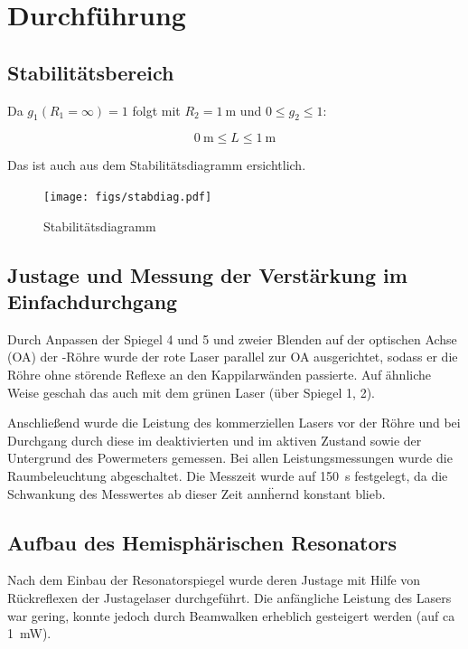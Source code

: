 \documentclass[slug=GL, room=HZDR\ Dresden/Rossendorf\,\ Geb.\ 620/123, supervisor=Tim\ Ziegler]{../../Lab_Report_LaTeX/lab_report}
\begin{document}
\section{Durchf\"uhrung}
\label{sec:durch}

\subsection{Stabilit\"atsbereich}
\label{sec:stabber}

Da \(g_1(R_1=\infty)=1\) folgt mit \(R_2=\SI{1}{\meter}\) und \(0\leq g_2\leq 1\):

\begin{equation}
  \label{eq:stabber}
  \SI{0}{\meter}\leq L \leq \SI{1}{\meter}
\end{equation}

Das ist auch aus dem Stabilit\"atsdiagramm ersichtlich.
\begin{figure}[b]\centering
  \texttt{[image: figs/stabdiag.pdf]}
  \caption[Gauss]{Stabilit\"atsdiagramm}
  \label{fig:stabdiag}
\end{figure}

\subsection{Justage und Messung der Verst\"arkung im Einfachdurchgang}
\label{sec:justage}

Durch Anpassen der Spiegel 4 und 5 und zweier Blenden auf der
optischen Achse (OA) der -R\"ohre wurde der rote Laser
parallel zur OA ausgerichtet, sodass er die R\"ohre ohne st\"orende
Reflexe an den Kappilarw\"anden passierte. Auf \"ahnliche Weise
geschah das auch mit dem gr\"unen Laser (\"uber Spiegel 1, 2).

Anschlie\ss{}end wurde die Leistung des kommerziellen Lasers vor der
R\"ohre und bei Durchgang durch diese im deaktivierten und im aktiven
Zustand sowie der Untergrund des Powermeters gemessen. Bei allen
Leistungsmessungen wurde die Raumbeleuchtung abgeschaltet. Die
Messzeit wurde auf \SI{150}{\second} festgelegt, da die Schwankung
des Messwertes ab dieser Zeit ann\"hernd konstant blieb.

\subsection{Aufbau des Hemisph\"arischen Resonators}
\label{sec:aufbauhemi}

Nach dem Einbau der Resonatorspiegel wurde deren Justage mit Hilfe von
R\"uckreflexen der Justagelaser durchgef\"uhrt. Die anf\"angliche
Leistung des Lasers war gering, konnte jedoch durch Beamwalken
erheblich gesteigert werden (auf ca \SI{1}{\milli\watt}).
\end{document}
